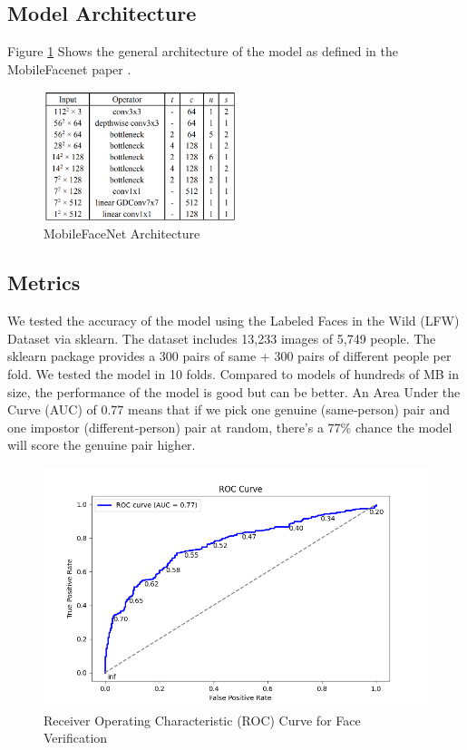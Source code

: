 \subsection{Model Architecture}
Figure \ref{fig:mfn_arch} Shows the general architecture of the model as defined in the MobileFacenet paper \cite{chen2018mobilefacenets}.
\begin{figure}[h] %
	\centering
	\includegraphics[width=0.5\textwidth]{figures/chapter4/mfn_arch.png} %
	\caption{MobileFaceNet Architecture}
	\label{fig:mfn_arch}
\end{figure}

\clearpage 
\subsection{Metrics}
We tested the accuracy of the model using the Labeled Faces in the Wild (LFW) Dataset via sklearn. The dataset includes 13,233 images of 5,749 people. The sklearn package provides a 300 pairs of same + 300 pairs of different people per fold. We tested the model in 10 folds.
Compared to models of hundreds of MB in size, the performance of the model is good but can be better. An Area Under the Curve (AUC) of 0.77 means that if we pick one genuine (same‐person) pair and one impostor (different‐person) pair at random, there’s a 77\% chance the model will score the genuine pair higher.
\begin{figure}[h] %
	\centering
	\includegraphics[width=1\textwidth]{figures/chapter4/roc_curve.png} %
	\caption{Receiver Operating Characteristic (ROC) Curve for Face Verification}
	\label{fig:roc_curve}
\end{figure}

